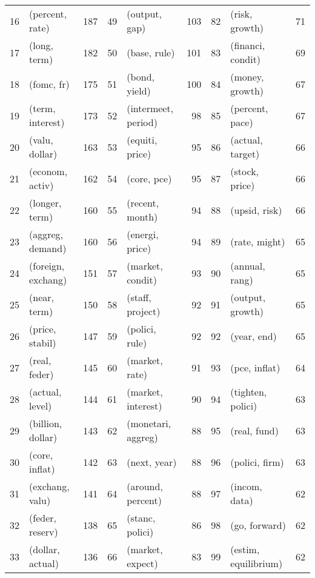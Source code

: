 \begin{tabular}{rlrrlrrlr}
 16 &     (percent, rate) &    187 &  49 &          (output, gap) &    103 &  82 &        (risk, growth) &     71 \\
 17 &        (long, term) &    182 &  50 &           (base, rule) &    101 &  83 &     (financi, condit) &     69 \\
 18 &          (fomc, fr) &    175 &  51 &          (bond, yield) &    100 &  84 &       (money, growth) &     67 \\
 19 &    (term, interest) &    173 &  52 &    (intermeet, period) &     98 &  85 &       (percent, pace) &     67 \\
 20 &      (valu, dollar) &    163 &  53 &        (equiti, price) &     95 &  86 &      (actual, target) &     66 \\
 21 &     (econom, activ) &    162 &  54 &            (core, pce) &     95 &  87 &        (stock, price) &     66 \\
 22 &      (longer, term) &    160 &  55 &        (recent, month) &     94 &  88 &         (upsid, risk) &     66 \\
 23 &    (aggreg, demand) &    160 &  56 &        (energi, price) &     94 &  89 &         (rate, might) &     65 \\
 24 &  (foreign, exchang) &    151 &  57 &       (market, condit) &     93 &  90 &        (annual, rang) &     65 \\
 25 &        (near, term) &    150 &  58 &       (staff, project) &     92 &  91 &      (output, growth) &     65 \\
 26 &     (price, stabil) &    147 &  59 &         (polici, rule) &     92 &  92 &           (year, end) &     65 \\
 27 &       (real, feder) &    145 &  60 &         (market, rate) &     91 &  93 &         (pce, inflat) &     64 \\
 28 &     (actual, level) &    144 &  61 &     (market, interest) &     90 &  94 &     (tighten, polici) &     63 \\
 29 &   (billion, dollar) &    143 &  62 &     (monetari, aggreg) &     88 &  95 &          (real, fund) &     63 \\
 30 &      (core, inflat) &    142 &  63 &           (next, year) &     88 &  96 &        (polici, firm) &     63 \\
 31 &     (exchang, valu) &    141 &  64 &      (around, percent) &     88 &  97 &         (incom, data) &     62 \\
 32 &     (feder, reserv) &    138 &  65 &        (stanc, polici) &     86 &  98 &         (go, forward) &     62 \\
 33 &    (dollar, actual) &    136 &  66 &       (market, expect) &     83 &  99 &  (estim, equilibrium) &     62 \\
\bottomrule
\end{tabular}
